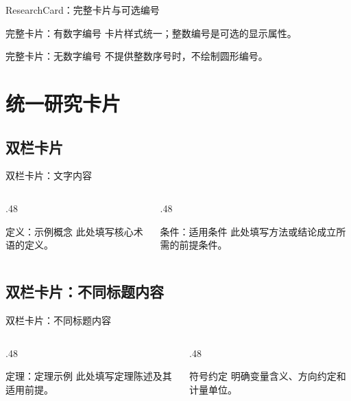 \documentclass[hyperref, UTF8, CJK, aspectratio=169]{beamer}
\begin{document}
\begin{frame}{ResearchCard：完整卡片与可选编号}
  \begin{ResearchCard}[1]{完整卡片：有数字编号}
    卡片样式统一；整数编号是可选的显示属性。
  \end{ResearchCard}
  \vspace{.35em}
  \begin{ResearchCard}{完整卡片：无数字编号}
    不提供整数序号时，不绘制圆形编号。
  \end{ResearchCard}
\end{frame}

\section{统一研究卡片}
\subsection{双栏卡片}
\begin{frame}{双栏卡片：文字内容}
  \begin{columns}[T,onlytextwidth]
    \begin{column}{.48\textwidth}
      \begin{ResearchCard}{定义：示例概念}
        此处填写核心术语的定义。
      \end{ResearchCard}
    \end{column}
    \begin{column}{.48\textwidth}
      \begin{ResearchCard}{条件：适用条件}
        此处填写方法或结论成立所需的前提条件。
      \end{ResearchCard}
    \end{column}
  \end{columns}
\end{frame}

\subsection{双栏卡片：不同标题内容}
\begin{frame}{双栏卡片：不同标题内容}
  \begin{columns}[T,onlytextwidth]
    \begin{column}{.48\textwidth}
      \begin{ResearchCard}{定理：定理示例}
        此处填写定理陈述及其适用前提。
      \end{ResearchCard}
    \end{column}
    \begin{column}{.48\textwidth}
      \begin{ResearchCard}{符号约定}
        明确变量含义、方向约定和计量单位。
      \end{ResearchCard}
    \end{column}
  \end{columns}
\end{frame}
\end{document}
